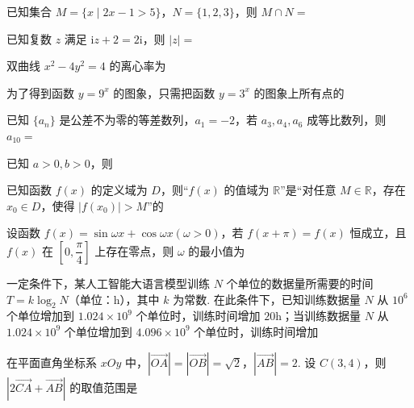\documentclass[a4paper,11pt]{report}
\begin{document}
\begin{examquestions}
\item 已知集合 $M=\{x\mid 2x-1>5\}$，$N=\{1,2,3\}$，则 $M\cap N=$
\item 已知复数 $z$ 满足 $\mathrm{i}z+2=2\mathrm{i}$，则 $|z|=$
\item 双曲线 $x^2-4y^2=4$ 的离心率为
\item 为了得到函数 $y=9^x$ 的图象，只需把函数 $y=3^x$ 的图象上所有点的
\item 已知 $\{a_n\}$ 是公差不为零的等差数列，$a_1=-2$，若 $a_3,a_4,a_6$ 成等比数列，则 $a_{10}=$
\item 已知 $a>0,b>0$，则
\item 已知函数 $f(x)$ 的定义域为 $D$，则“$f(x)$ 的值域为 $\mathbb R$”是“对任意 $M\in\mathbb R$，存在 $x_0\in D$，使得 $|f(x_0)|>M$”的
\item 设函数 $f(x)=\sin\omega x+\cos\omega x(\omega>0)$，若 $f(x+\pi)=f(x)$ 恒成立，且 $f(x)$ 在 $\left[0,\dfrac\pi4\right]$ 上存在零点，则 $\omega$ 的最小值为
\item 一定条件下，某人工智能大语言模型训练 $N$ 个单位的数据量所需要的时间 $T=k\log_2N$（单位：$\mathrm h$），其中 $k$ 为常数. 在此条件下，已知训练数据量 $N$ 从 $10^6$ 个单位增加到 $1.024\times10^9$ 个单位时，训练时间增加 $20\mathrm h$；当训练数据量 $N$ 从 $1.024\times10^9$ 个单位增加到 $4.096\times10^9$ 个单位时，训练时间增加
\item 在平面直角坐标系 $xOy$ 中，$|\vec{OA}|=|\vec{OB}|=\sqrt2$，$|\vec{AB}|=2$. 设 $C(3,4)$，则 $|2\vec{CA}+\vec{AB}|$ 的取值范围是
\fourchoices{$[6,14]$}{$[6,12]$}{$[8,14]$}{$[8,12]$}
\end{examquestions}
\end{document}
